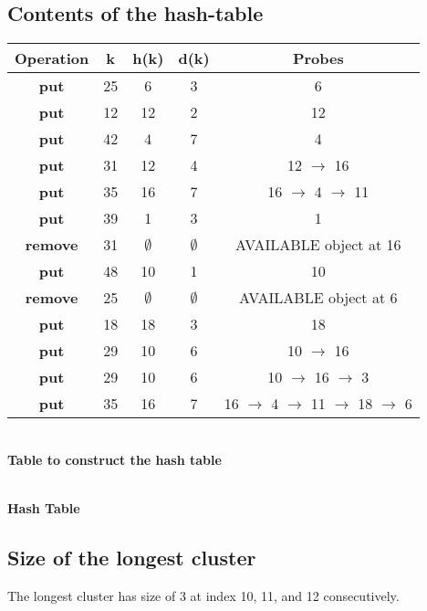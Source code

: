 \subsection{Contents of the hash-table}
\begin{center}
 \begin{tabular}{||c c c c c||} 
 \hline
 Operation & k & h(k) & d(k) & Probes \\ [2ex] 
 \hline \hline
 \textbf{put} & 25 & 6 & 3 & 6 \\
 \textbf{put} & 12 & 12 & 2 & 12 \\
 \textbf{put} & 42 & 4 & 7 & 4 \\
 \textbf{put} & 31 & 12 & 4 & 12 $\rightarrow$ 16 \\
 \textbf{put} & 35 & 16 & 7 & 16 $\rightarrow$ 4 $\rightarrow$ 11 \\ 
 \textbf{put} & 39 & 1 & 3 & 1 \\
 \textbf{remove} & 31 & $\emptyset$ & $\emptyset$ & AVAILABLE object at 16 \\
 \textbf{put} & 48 & 10 & 1 & 10 \\
 \textbf{remove} & 25 & $\emptyset$ & $\emptyset$ & AVAILABLE object at 6 \\
 \textbf{put} & 18 & 18 & 3 & 18 \\
 \textbf{put} & 29 & 10 & 6 & 10 $\rightarrow$ 16 \\
 \textbf{put} & 29 & 10 & 6 & 10 $\rightarrow$ 16 $\rightarrow$ 3 \\
 \textbf{put} & 35 & 16 & 7 & 16 $\rightarrow$ 4 $\rightarrow$ 11 $\rightarrow$ 18 $\rightarrow$ 6 \\ [2ex]
 \hline 
 \end{tabular}
 \\
 \textbf{Table to construct the hash table}
\end{center}

\\
\textbf{Hash Table}
\\

\subsection{Size of the longest cluster}
The longest cluster has size of 3 at index 10, 11, and 12 consecutively.

